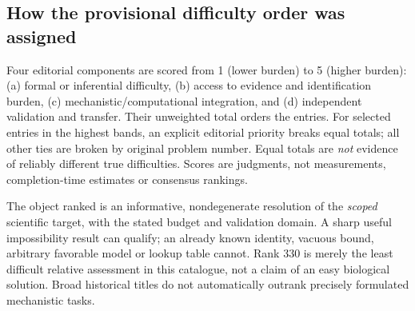 \documentclass[11pt]{article}
\begin{document}
\subsection*{How the provisional difficulty order was assigned}
Four editorial components are scored from 1 (lower burden) to 5 (higher burden): (a) formal or inferential difficulty, (b) access to evidence and identification burden, (c) mechanistic/computational integration, and (d) independent validation and transfer. Their unweighted total orders the entries. For selected entries in the highest bands, an explicit editorial priority breaks equal totals; all other ties are broken by original problem number. Equal totals are \emph{not} evidence of reliably different true difficulties. Scores are judgments, not measurements, completion-time estimates or consensus rankings.

The object ranked is an informative, nondegenerate resolution of the \emph{scoped} scientific target, with the stated budget and validation domain. A sharp useful impossibility result can qualify; an already known identity, vacuous bound, arbitrary favorable model or lookup table cannot. Rank 330 is merely the least difficult relative assessment in this catalogue, not a claim of an easy biological solution. Broad historical titles do not automatically outrank precisely formulated mechanistic tasks.
\end{document}
